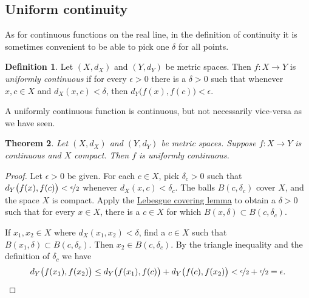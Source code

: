 \documentclass[12pt]{book}
\theoremstyle{plain}
\newtheorem{thm}{Theorem}[section]
\theoremstyle{remark}
\theoremstyle{definition}
\newtheorem{defn}[thm]{Definition}
\theoremstyle{exercise}
\theoremstyle{example}
\begin{document}
\subsection{Uniform continuity}

As for continuous
functions on the real line, in the definition of continuity
it is sometimes convenient to be able to pick
one $\delta$ for all points.

\begin{defn}
Let $(X,d_X)$ and $(Y,d_Y)$ be metric spaces.
Then $f \colon X \to Y$ is
\emph{uniformly continuous}
if for every $\epsilon > 0$
there is a $\delta > 0$ such that whenever $x,c \in X$ and $d_X(x,c) <
\delta$, then
$d_Y\bigl(f(x),f(c)\bigr) < \epsilon$.
\end{defn}

A uniformly continuous function is continuous, but not necessarily
vice-versa as we have seen.

\begin{thm} \label{thm:Xcompactfunifcont}
Let $(X,d_X)$ and $(Y,d_Y)$ be metric spaces.
Suppose $f \colon X \to Y$ is continuous and $X$ compact.  Then
$f$ is uniformly continuous.
\end{thm}

\begin{proof}
Let $\epsilon > 0$ be given.  For each $c \in X$, pick $\delta_c > 0$ such that
$d_Y\bigl(f(x),f(c)\bigr) < \nicefrac{\epsilon}{2}$
whenever
$d_X(x,c) < \delta_c$.
The balls
$B(c,\delta_c)$ cover $X$, and the space $X$ is compact.  
Apply the \hyperref[ms:lebesgue]{Lebesgue covering lemma} to obtain a 
$\delta > 0$ such that for every $x \in X$, there is a $c \in X$
for which $B(x,\delta) \subset B(c,\delta_c)$.

If $x_1, x_2 \in X$ where $d_X(x_1,x_2) < \delta$,
find a $c \in X$ such that $B(x_1,\delta) \subset B(c,\delta_c)$.
Then $x_2 \in B(c,\delta_c)$.  By the triangle inequality
and the definition of $\delta_c$ we have
\begin{equation*}
d_Y\bigl(f(x_1),f(x_2)\bigr)
\leq
d_Y\bigl(f(x_1),f(c)\bigr)
+
d_Y\bigl(f(c),f(x_2)\bigr)
<
\nicefrac{\epsilon}{2}+
\nicefrac{\epsilon}{2} = \epsilon .  \qedhere
\end{equation*}
\end{proof}
\end{document}
